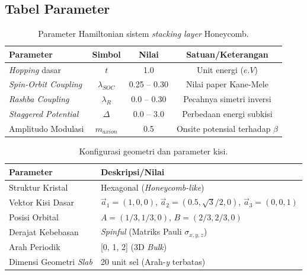 \subsection{Tabel Parameter}
\begin{table}[htbp]
\centering
\caption{Parameter Hamiltonian sistem \textit{stacking layer} Honeycomb.}
\label{tab:param_hamiltonian}
\begin{tabular}{@{}lccc@{}}
\toprule
\textbf{Parameter} & \textbf{Simbol} & \textbf{Nilai} & \textbf{Satuan/Keterangan} \\ \midrule
\textit{Hopping} dasar & $t$ & 1.0 & Unit energi ($e.V$) \\
\textit{Spin-Orbit Coupling} & $\lambda_{SOC}$ & 0.25 -- 0.30 & Nilai paper Kane-Mele \\
\textit{Rashba Coupling} & $\lambda_{R}$ & 0.0 -- 0.30 & Pecahnya simetri inversi \\
\textit{Staggered Potential} & $\Delta$ & 0.0 -- 3.0 & Perbedaan energi subkisi \\

Amplitudo Modulasi & $m_{axion}$ & 0.5 & Onsite potensial terhadap $\beta$ \\ \bottomrule
\end{tabular}
\end{table}

\begin{table}[htbp]
\centering
\caption{Konfigurasi geometri dan parameter kisi.}
\label{tab:param_geometri}
\begin{tabular}{@{}ll@{}}
\toprule
\textbf{Parameter} & \textbf{Deskripsi/Nilai} \\ \midrule
Struktur Kristal & Hexagonal (\textit{Honeycomb-like}) \\
Vektor Kisi Dasar & $\vec{a}_1 = (1, 0, 0)$, $\vec{a}_2 = (0.5, \sqrt{3}/2, 0)$, $\vec{a}_3 = (0, 0, 1)$ \\
Posisi Orbital & $A = (1/3, 1/3, 0)$, $B = (2/3, 2/3, 0)$ \\
Derajat Kebebasan & \textit{Spinful} (Matriks Pauli $\sigma_{x,y,z}$) \\
Arah Periodik & [0, 1, 2] (3D \textit{Bulk}) \\
Dimensi Geometri \textit{Slab} & 20 unit sel (Arah-\textit{y} terbatas) \\ \bottomrule
\end{tabular}
\end{table}

